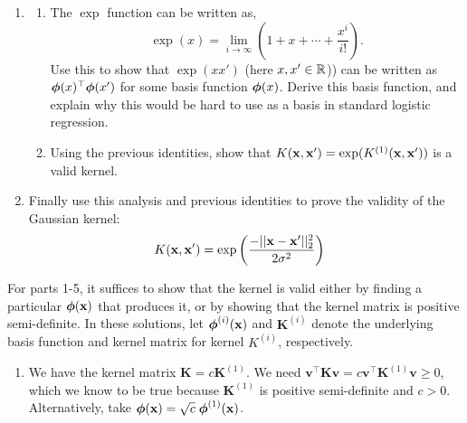 \documentclass[11pt,letterpaper]{article}
\begin{document}
\begin{enumerate}
{{\begin{enumerate}
  [Hint: Use the property that for any
  $\bphi(\boldx)$,
  $K(\boldx, \boldx') = \bphi(\boldx)^\top\bphi(\boldx')$ forms a
  positive semi-definite kernel matrix. ]
  \item 
  \begin{enumerate}
    \item The $\exp$ function can be written as,
    $$\exp(x) = \lim_{i\rightarrow \infty} \left(1 + x + \cdots + \frac{x^i}{i!}\right).$$
      Use this to show that $\exp(xx')$ (here
          $x, x'\in \mathbb{R}$)) can be written as $\boldsymbol{\phi}(x)^\top \boldsymbol{\phi}(x')$ for some basis function $\boldsymbol{\phi}(x)$. Derive this basis function,
          and explain why this  would be hard to use as a basis in standard logistic regression.
    \item Using the previous identities, show that $K(\mathbf{x}, \mathbf{x}') = \exp( K^{(1)}(\mathbf{x}, \mathbf{x}'))$ is a valid kernel.
  \end{enumerate}
  \item  Finally use this analysis and previous identities to prove the validity of the Gaussian kernel:
  \begin{align*}
  K(\mathbf{x}, \mathbf{x}') &= \exp \left( \frac{-||\mathbf{x} - \mathbf{x}'||^2_2}{2\sigma^2} \right) 
  \end{align*}
  \end{enumerate}
}}

\newpage

\begin{solution}

\vspace{\baselineskip}


    \noindent For parts 1-5, it suffices to show that the kernel is valid either by 
    finding a particular $\bphi(\boldx)$ that produces it, or by showing that the kernel matrix 
    is positive semi-definite. In these solutions, let $\boldsymbol{\phi}^{(i)}(\mathbf{x})$ and $\mathbf{K}^{(i)}$ 
    denote the underlying basis function and kernel matrix for kernel $K^{(i)}$, respectively.
    \begin{enumerate}
      \item We have the kernel matrix $\mathbf{K} = c \mathbf{K}^{(1)}$. We need $\mathbf{v}^\top \mathbf{K} \mathbf{v} = c \mathbf{v}^\top \mathbf{K}^{(1)} \mathbf{v} \geq 0$, which we know to be true because $\mathbf{K}^{(1)}$ is positive semi-definite and $c > 0$.\\
      Alternatively, take $\boldsymbol{\phi}(\mathbf{x}) = \sqrt{c} \; \boldsymbol{\phi}^{(1)}(\mathbf{x})$.


\end{enumerate}
\end{solution}
\end{enumerate}
\end{document}
